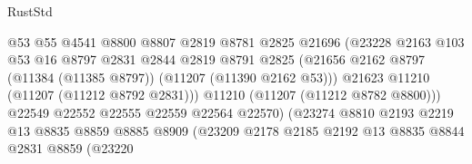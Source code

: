 \begin{lexlean}{RustStd}
\begin{coremodule}
                                        @53
                                        @55
                                        @4541
                                        @8800
                                        @8807
                                        @2819
                                        @8781
                                        @2825
                                        @21696
                                        (@23228
                                          @2163
                                          @103
                                          @53
                                          @16
                                          @8797
                                          @2831
                                          @2844
                                          @2819
                                          @8791
                                          @2825
                                          (@21656
                                            @2162
                                            @8797
                                            (@11384 (@11385 @8797))
                                            (@11207 (@11390 @2162 @53)))
                                          @21623
                                          @11210
                                          (@11207 (@11212 @8792 @2831)))
                                        @11210
                                        (@11207 (@11212 @8782 @8800)))
                                      @22549
                                      @22552
                                      @22555
                                      @22559
                                      @22564
                                      @22570)
                                    (@23274
                                      @8810
                                      @2193
                                      @2219
                                      @13
                                      @8835
                                      @8859
                                      @8885
                                      @8909
                                      (@23209
                                        @2178
                                        @2185
                                        @2192
                                        @13
                                        @8835
                                        @8844
                                        @2831
                                        @8859
                                        (@23220

\end{coremodule}
\end{lexlean}
